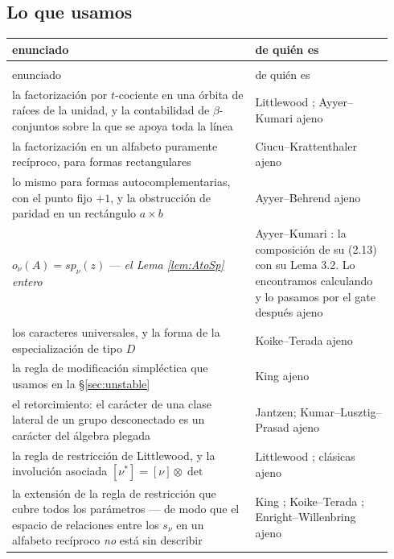 \documentclass[11pt,reqno]{amsart}
\newcommand{\stext}{\textcolor{hext}{\small ajeno}}
\theoremstyle{plain}
\theoremstyle{definition}
\begin{document}
\subsection*{Lo que usamos}
\begingroup{}\footnotesize\setlength{\tabcolsep}{4.0pt}
\begin{longtable}{@{}>{\raggedright\arraybackslash}p{0.60\linewidth}%
                   >{\raggedright\arraybackslash}p{0.34\linewidth}@{}}
\toprule
enunciado & de quién es\\
\midrule
\endfirsthead
\multicolumn{2}{@{}l}{\footnotesize\itshape Lo que usamos, continuación}\\[1pt]
\toprule
enunciado & de quién es\\
\midrule
\endhead
la factorización por $t$-cociente en una órbita de raíces de la unidad, y la contabilidad de
$\beta$-conjuntos sobre la que se apoya toda la línea & Littlewood \cite{Lit50}; Ayyer--Kumari
\cite{AK22}
\stext\\
la factorización en un alfabeto puramente recíproco, para formas rectangulares &
Ciucu--Krattenthaler \cite{CK09} \stext\\
lo mismo para formas autocomplementarias, con el punto fijo $+1$, y la obstrucción de paridad en un
rectángulo $a\times b$ & Ayyer--Behrend \cite{AB19} \stext\\
$o_\nu(A)=sp_\nu(z)$ --- \emph{el Lema \ref{lem:AtoSp} entero} & Ayyer--Kumari \cite{AK25}: la
composición de su (2.13) con su Lema 3.2. Lo encontramos calculando y lo pasamos por el gate después
\stext\\
los caracteres universales, y la forma de la especialización de tipo $D$ & Koike--Terada \cite{KT87}
\stext\\
la regla de modificación simpléctica que usamos en la \S\ref{sec:unstable} & King \cite{King71}
\stext\\
el retorcimiento: el carácter de una clase lateral de un grupo desconectado es un carácter del
álgebra plegada & Jantzen; Kumar--Lusztig--Prasad \cite{Jantzen,KLP} \stext\\
la regla de restricción de Littlewood, y la involución asociada $[\nu^*]=[\nu]\otimes\det$ &
Littlewood \cite{Lit50}; clásicas \stext\\
la extensión de la regla de restricción que cubre todos los parámetros --- de modo que el espacio de
relaciones entre los $s_\nu$ en un alfabeto recíproco \emph{no} está sin describir &
King \cite{King71}; Koike--Terada \cite{KT87}; Enright--Willenbring \cite{EW04} \stext\\

\end{longtable}
\end{document}
